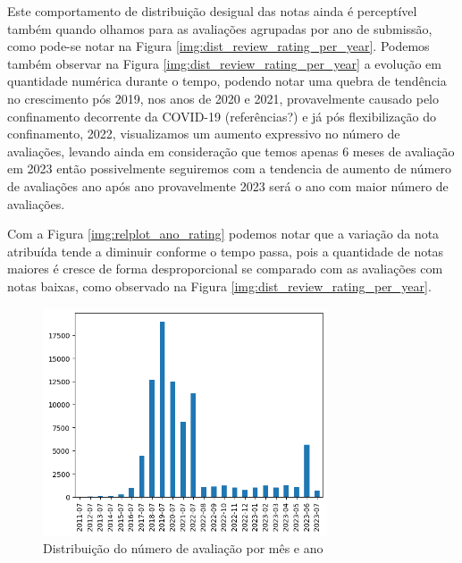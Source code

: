Este comportamento de distribuição desigual das notas ainda é perceptível também quando olhamos para as avaliações agrupadas por ano de submissão, como pode-se notar na Figura \ref{img:dist_review_rating_per_year}. Podemos também observar na Figura \ref{img:dist_review_rating_per_year} a evolução em quantidade numérica durante o tempo, podendo notar uma quebra de tendência no crescimento pós 2019, nos anos de 2020 e 2021, provavelmente causado pelo confinamento decorrente da COVID-19 (referências?) e já pós flexibilização do confinamento, 2022, visualizamos um aumento expressivo no número de avaliações, levando ainda em consideração que temos apenas 6 meses de avaliação em 2023 então possivelmente seguiremos com a tendencia de aumento de número de avaliações ano após ano provavelmente 2023 será o ano com maior número de avaliações.

Com a Figura \ref{img:relplot_ano_rating} podemos notar que a variação da nota atribuída tende a diminuir conforme o tempo passa, pois a quantidade de notas maiores é cresce de forma desproporcional se comparado com as avaliações com notas baixas, como observado na Figura \ref{img:dist_review_rating_per_year}.

\begin{figure}
	\centering
	\includegraphics[width=0.75\textwidth]{figs/exploratoria/distribuicao_ano_mes_avaliacao.png}
	\caption{Distribuição do número de avaliação por mês e ano}
	\label{img:dist_ano_mes_avaliacao}
\end{figure}

